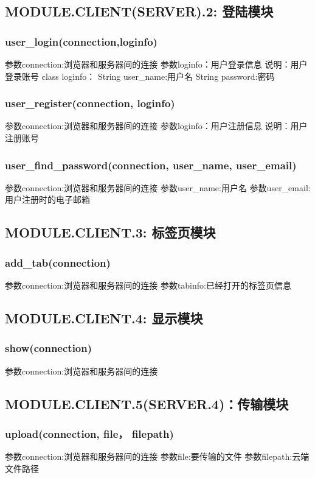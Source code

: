 \subsection{MODULE.CLIENT(SERVER).2: 登陆模块}

\subsubsection{user\_login(connection,loginfo)}
参数connection:浏览器和服务器间的连接
参数loginfo：用户登录信息
说明：用户登录账号
class loginfo：
String user\_name:用户名
String password:密码
\subsubsection{user\_register(connection, loginfo)}
参数connection:浏览器和服务器间的连接
参数loginfo：用户注册信息
说明：用户注册账号
\subsubsection{user\_find\_password(connection, user\_name, user\_email)}
参数connection:浏览器和服务器间的连接
参数user\_name:用户名
参数user\_email:用户注册时的电子邮箱

\subsection{MODULE.CLIENT.3: 标签页模块}

\subsubsection{add\_tab(connection)}
参数connection:浏览器和服务器间的连接
参数tabinfo:已经打开的标签页信息
\subsection{MODULE.CLIENT.4: 显示模块}

\subsubsection{show(connection)}
参数connection:浏览器和服务器间的连接

\subsection{MODULE.CLIENT.5(SERVER.4)：传输模块}
\subsubsection{upload(connection, file， filepath)}
参数connection:浏览器和服务器间的连接
参数file:要传输的文件
参数filepath:云端文件路径
